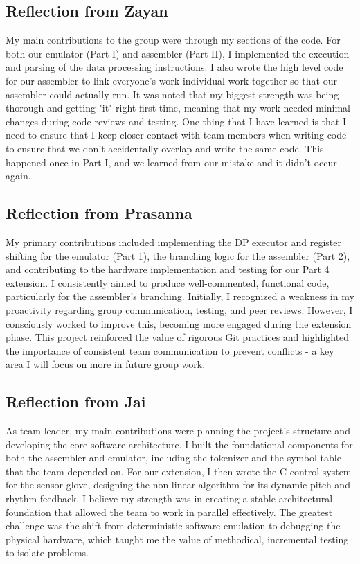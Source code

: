 \documentclass[11pt]{article}
\begin{document}
\subsection{Reflection from Zayan}
My main contributions to the group were through my sections of the code. For both our emulator (Part I) and assembler (Part II), I implemented the 
execution and parsing of the data processing instructions. I also wrote the high level code for our assembler to link everyone's work individual work 
together so that our assembler could actually run. It was noted that my biggest strength was being thorough and getting "it" right first time, meaning that 
my work needed minimal changes during code reviews and testing. One thing that I have learned is that I need to ensure that I keep closer contact with 
team members when writing code - to ensure that we don't accidentally overlap and write the same code. This happened once in Part I, and we learned from our 
mistake and it didn't occur again.

\subsection{Reflection from Prasanna}
My primary contributions included implementing the DP executor and register shifting for the emulator (Part 1), the branching logic for the assembler (Part 2), and contributing to the hardware implementation and testing for our Part 4 extension. I consistently aimed to produce well-commented, functional code, particularly for the assembler's branching. Initially, I recognized a weakness in my proactivity regarding group communication, testing, and peer reviews. However, I consciously worked to improve this, becoming more engaged during the extension phase. This project reinforced the value of rigorous Git practices and highlighted the importance of consistent team communication to prevent conflicts - a key area I will focus on more in future group work.

\subsection{Reflection from Jai}
As team leader, my main contributions were planning the project's structure and developing the core software architecture. I built the foundational components 
for both the assembler and emulator, including the tokenizer and the symbol table that the team depended on. For our extension, I then wrote the C control 
system for the sensor glove, designing the non-linear algorithm for its dynamic pitch and rhythm feedback. I believe my strength was in creating a stable 
architectural foundation that allowed the team to work in parallel effectively. The greatest challenge was the shift from deterministic software emulation 
to debugging the physical hardware, which taught me the value of methodical, incremental testing to isolate problems.
\end{document}
